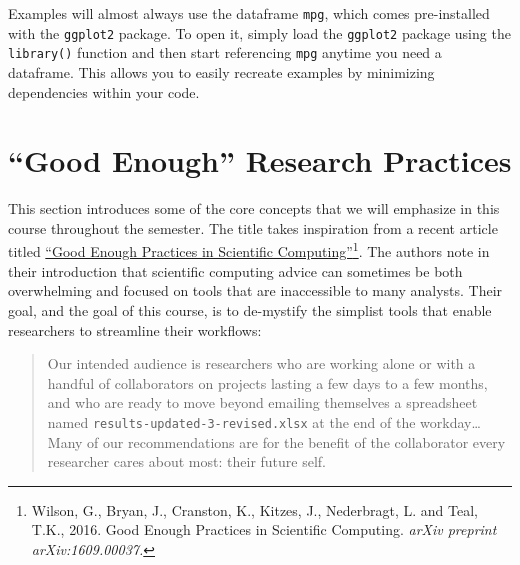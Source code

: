 \documentclass[]{book}
\newenvironment{Shaded}{\begin{snugshade}}{\end{snugshade}}
\newcommand{\DecValTok}[1]{\textcolor[rgb]{0.00,0.00,0.81}{#1}}
\newcommand{\StringTok}[1]{\textcolor[rgb]{0.31,0.60,0.02}{#1}}
\newcommand{\OperatorTok}[1]{\textcolor[rgb]{0.81,0.36,0.00}{\textbf{#1}}}
\newcommand{\NormalTok}[1]{#1}
\let\rmarkdownfootnote\footnote%
\def\footnote{\protect\rmarkdownfootnote}
\theoremstyle{definition}
\theoremstyle{definition}
\theoremstyle{definition}
\theoremstyle{remark}
\begin{document}
\begin{Shaded}
\end{Shaded}

Examples will almost always use the dataframe \texttt{mpg}, which comes
pre-installed with the \texttt{ggplot2} package. To open it, simply load
the \texttt{ggplot2} package using the \texttt{library()} function and
then start referencing \texttt{mpg} anytime you need a dataframe. This
allows you to easily recreate examples by minimizing dependencies within
your code.

\chapter{\texorpdfstring{``Good Enough'' Research
Practices}{Good Enough Research Practices}}\label{good-enough-research-practices}

This section introduces some of the core concepts that we will emphasize
in this course throughout the semester. The title takes inspiration from
a recent article titled \href{https://arxiv.org/abs/1609.00037}{``Good
Enough Practices in Scientific Computing''}\footnote{Wilson, G., Bryan,
  J., Cranston, K., Kitzes, J., Nederbragt, L. and Teal, T.K., 2016.
  Good Enough Practices in Scientific Computing. \emph{arXiv preprint
  arXiv:1609.00037.}}. The authors note in their introduction that
scientific computing advice can sometimes be both overwhelming and
focused on tools that are inaccessible to many analysts. Their goal, and
the goal of this course, is to de-mystify the simplist tools that enable
researchers to streamline their workflows:

\begin{quote}
Our intended audience is researchers who are working alone or with a
handful of collaborators on projects lasting a few days to a few months,
and who are ready to move beyond emailing themselves a spreadsheet named
\texttt{results-updated-3-revised.xlsx} at the end of the
workday\ldots{}Many of our recommendations are for the benefit of the
collaborator every researcher cares about most: their future self.
\end{quote}
\end{document}
